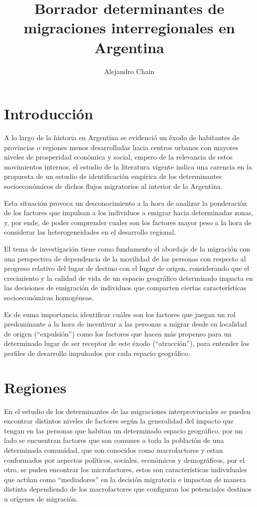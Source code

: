\documentclass[12pt,a4paper]{article}
\author{Alejandro Chain}
\title{Borrador determinantes de migraciones interregionales en Argentina}
\begin{document}
\maketitle
\newpage
\tableofcontents
\newpage
\section{Introducción}
A lo largo de la historia en Argentina se evidenció un éxodo de habitantes de provincias o
regiones menos desarrolladas hacia centros urbanos con mayores niveles de prosperidad económica y social, empero de la relevancia de estos movimientos internos, el estudio de la literatura vigente indica una carencia en la propuesta de un estudio de identificación empírica de los determinantes socioeconómicos de dichos flujos migratorios al interior de la Argentina.

Esta situación provoca un desconocimiento a la hora de analizar la ponderación de los factores que impulsan a los individuos a emigrar hacia determinadas zonas, y, por ende, de poder comprender cuales son los factores mayor peso a la hora de considerar las heterogeneidades en el desarrollo regional.

El tema de investigación tiene como fundamento el abordaje de la migración con una perspectiva de dependencia de la movilidad de las personas con respecto al progreso relativo del lugar de destino con el lugar de origen, considerando que el crecimiento y la calidad de vida de un espacio geográfico determinado impacta en las decisiones de emigración de individuos que comparten ciertas características socioeconómicas homogéneas.

Es de suma importancia identificar cuáles son los factores que juegan un rol predominante a la hora de incentivar a las personas a migrar desde su localidad de origen (“expulsión”) como los factores que hacen más propenso para un determinado lugar de ser receptor de este éxodo (“atracción”), para entender los perfiles de desarrollo impulsados por cada espacio geográfico.

\section{Regiones}
En el estudio de los determinantes de las migraciones interprovinciales se pueden encontrar distintos niveles de factores según la generalidad del impacto que tengan en las personas que habitan un determinado espacio geográfico, por un lado se encuentran factores que son comunes a toda la población de una determinada comunidad, que son conocidos como macrofactores y estan conformados por aspectos políticos, sociales, económicos y demográficos, por el otro, se puden encontrar los microfactores, estos son características individuales que actúan como “mediadores” en la decisión migratoria e impactan de manera distinta dependiendo de los macrofactores que configuran los potenciales destinos u orígenes de migración.
\end{document}
